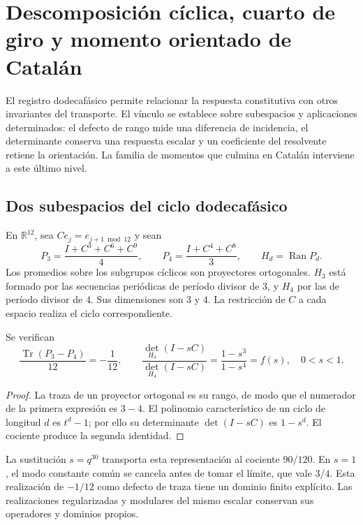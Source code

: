 \section{Descomposición cíclica, cuarto de giro y momento orientado de Catalán}
\label{iii:sec:catalan}

El registro dodecafásico permite relacionar la respuesta constitutiva con
otros invariantes del transporte. El vínculo se establece sobre subespacios
y aplicaciones determinados: el defecto de rango mide una diferencia de
incidencia, el determinante conserva una respuesta escalar y un coeficiente
del resolvente retiene la orientación. La familia de momentos que culmina
en Catalán interviene a este último nivel.

\subsection{Dos subespacios del ciclo dodecafásico}

En $\mathbb R^{12}$, sea $C e_j=e_{j+1\bmod12}$ y sean
\begin{equation}
 P_3=\frac{I+C^3+C^6+C^9}{4},\qquad
 P_4=\frac{I+C^4+C^8}{3},\qquad H_d=\operatorname{Ran}P_d.
 \label{iii:eq:projectors34}
\end{equation}
Los promedios sobre los subgrupos cíclicos son proyectores ortogonales.
$H_3$ está formado por las secuencias periódicas de período divisor de $3$,
y $H_4$ por las de período divisor de $4$. Sus dimensiones son $3$ y $4$.
La restricción de $C$ a cada espacio realiza el ciclo correspondiente.

\begin{proposition}
Se verifican
\begin{equation}
 \frac{\operatorname{Tr}(P_3-P_4)}{12}=-\frac1{12},\qquad
 \frac{\det_{H_3}(I-sC)}{\det_{H_4}(I-sC)}
 =\frac{1-s^3}{1-s^4}=f(s),\quad 0<s<1.
 \label{iii:eq:trace-det}
\end{equation}
\end{proposition}
\begin{proof}
La traza de un proyector ortogonal es su rango, de modo que el numerador
de la primera expresión es $3-4$. El polinomio característico de un ciclo
de longitud $d$ es $t^d-1$; por ello su determinante $\det(I-sC)$ es
$1-s^d$. El cociente produce la segunda identidad.
\end{proof}

La sustitución $s=q^{30}$ transporta esta representación al cociente
$90/120$. En $s=1$, el modo constante común se cancela antes de tomar el
límite, que vale $3/4$. Esta realización de $-1/12$ como defecto de traza
tiene un dominio finito explícito. Las realizaciones regularizadas y
modulares del mismo escalar conservan sus operadores y dominios propios.

